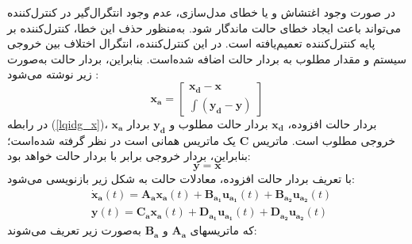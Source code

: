 در صورت وجود اغتشاش و یا خطای مدل‌سازی، عدم وجود انتگرال‌گیر در کنترل‌کننده
 می‌تواند باعث ایجاد خطای حالت ماندگار شود. به‌منظور حذف این خطا، کنترل‌کننده
 بر پایه کنترل‌کننده
 تعمیم‌یافته است. در این کنترل‌کننده، انتگرال اختلاف بین خروجی سیستم و مقدار مطلوب به بردار حالت اضافه شده‌است. بنابراین، بردار حالت به‌صورت زیر نوشته می‌شود
 \cite{reza_pordal}:
 \begin{equation}\label{lqidg_x}
 	\boldsymbol{x_a} = \begin{bmatrix}
 		\boldsymbol{x_d} - \boldsymbol{x}\\
 		\displaystyle \int (\boldsymbol{y_d} - \boldsymbol{y})
 	\end{bmatrix}
 \end{equation}
در رابطه
(\ref{lqidg_x})،
$	\boldsymbol{x_a}$
بردار حالت افزوده،
$	\boldsymbol{x_d}$
بردار حالت مطلوب و
$	\boldsymbol{y_d}$
  بردار خروجی مطلوب است. ماتریس
  $	\boldsymbol{C}$
 یک ماتریس همانی است در نظر گرفته شده‌است؛ بنابراین، بردار خروجی برابر با بردار حالت خواهد
بود:
\begin{equation}
	\boldsymbol{y} = \boldsymbol{x}
\end{equation}
با تعریف بردار حالت افزوده، معادلات حالت به شكل زیر بازنویسی می‌شود:
 \begin{equation}\label{systemlqidg}
	\begin{split}
		&\boldsymbol{\dot x_a}(t) = \boldsymbol{A_ax_a}(t) + \boldsymbol{B_{{a_1}}u_{a_1}}(t) + \boldsymbol{B_{{a_2}}u_{a_2}}(t)%
		\\
		&\boldsymbol{y}(t) = \boldsymbol{C_ax_a}(t) + \boldsymbol{D_{{a_1}}u_{a_1}}(t) + \boldsymbol{D_{{a_2}}u_{a_2}}(t)
	\end{split}
\end{equation}
که ماتریسهای $\boldsymbol{A_a}$ و $\boldsymbol{B_a}$ به‌صورت زیر تعریف می‌شوند:

